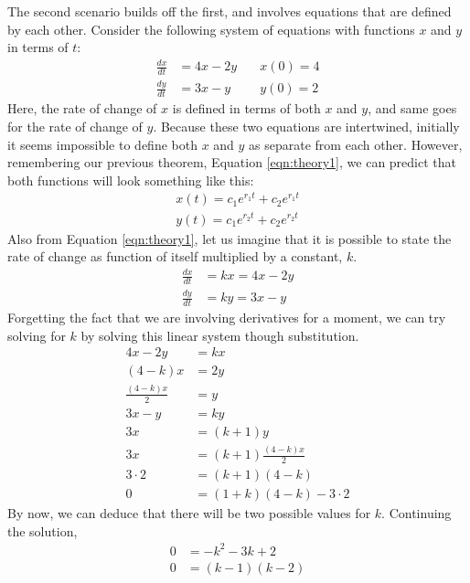 \documentclass[12pt]{article}
\begin{document}
	The second scenario builds off the first, and involves equations that are defined by each other.
	Consider the following system of equations with functions $x$ and $y$ in terms of $t$:
	\begin{align*}
		\frac{dx}{dt} &= 4x - 2y \quad &x(0) = 4 \\
		\frac{dy}{dt} &= 3x - y \quad &y(0) = 2
	\end{align*}
	Here, the rate of change of $x$ is defined in terms of both $x$ and $y$, and same goes for the rate of change of $y$.
	Because these two equations are intertwined, initially it seems impossible to define both $x$ and $y$ as separate from each other.
	However, remembering our previous theorem, Equation \eqref{eqn:theory1}, we can predict that both functions will look something like this:
	\begin{align}
		x(t) = c_1e^{r_1t} + c_2e^{r_1t} \label{eqn:x-t-general}\\
		y(t) = c_1e^{r_2t} + c_2e^{r_2t} \label{eqn:y-t-general}
	\end{align}
	Also from Equation \eqref{eqn:theory1}, let us imagine that it is possible to state the rate of change as function of itself multiplied by a constant, $k$.
	\begin{align}
		\frac{dx}{dt} &= kx = 4x - 2y \label{eqn:kx-sys}\\
		\frac{dy}{dt} &= ky = 3x - y \label{eqn:ky-sys}
	\end{align}
	Forgetting the fact that we are involving derivatives for a moment, we can try solving for $k$ by solving this linear system though substitution.
	\begin{align}
		4x - 2y &= kx \nonumber \\
		(4 - k)x &= 2y \nonumber \\
		\frac{(4 - k)x}{2} &= y \nonumber \\
		3x - y &=ky \nonumber \\
		3x &= (k + 1)y \nonumber \\
		3x &= (k + 1)\frac{(4 - k)x}{2} \nonumber \\
		3\cdot2 &= (k + 1)(4 - k) \nonumber \\
		0 &= (1 + k)(4 - k) - 3\cdot2 \label{eqn:chr-polynomial-ex}
	\end{align}
	By now, we can deduce that there will be two possible values for $k$.
	Continuing the solution,
	\begin{align*}
		0 &= -k^2 - 3k + 2 \\
		0 &= (k - 1)(k - 2)
	\end{align*}
\end{document}
